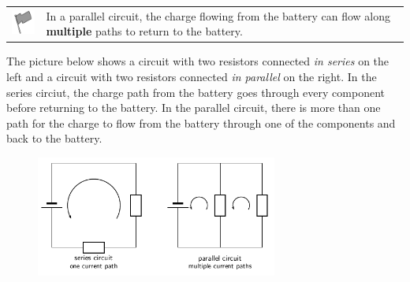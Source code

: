 \label{m38771*fhsst!!!underscore!!!id286}\begin{definition}
	  \begin{tabular*}{15 cm}{m{15 mm}m{}}
	\hspace*{-50pt}  \includegraphics[width=0.5in]{col11305.imgs/psflag2.png}   & \Definition{   \label{id2478767}\textbf{ Parallel circuit }} { \label{m38771*meaningfhsst!!!underscore!!!id286}
          \label{m38771*id63335}In a parallel circuit, the charge flowing from the battery can flow along \textbf{multiple} paths to return to the battery. \par 
           } 
      \end{tabular*}
      \end{definition}

          \label{m38771*id63352}The picture below shows a circuit with two resistors connected \textsl{in series} on the left and a circuit with two resistors connected \textsl{in parallel} on the right. In the series circiut, the charge path from the battery goes through every component before returning to the battery. In the parallel circuit, there is more than one path for the charge to flow from the battery through one of the components and back to the battery.\par 
          \label{m38771*id63369}
            
    \setcounter{subfigure}{0}


	\begin{figure}[H] %
    \begin{center}
    \label{m38771*id63372!!!underscore!!!media}\label{m38771*id63372!!!underscore!!!printimage}\includegraphics[width=300px]{col11305.imgs/m38771_PG11C9_006.png} %
        
      \vspace{2pt}
    \vspace{.1in}
    
    \end{center}

 \end{figure}   

